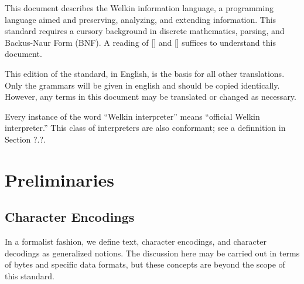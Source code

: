 

This document describes the Welkin information language, a programming language aimed and preserving, analyzing, and extending information. This standard requires a cursory background in discrete mathematics, parsing, and Backus-Naur Form (BNF). A reading of [] and [] suffices to understand this document.

This edition of the standard, in English, is the basis for all other translations. Only the grammars will be given in english and should be copied identically. However, any terms in this document may be translated or changed as necessary.

Every instance of the word ``Welkin interpreter'' means ``official Welkin interpreter.'' This class of interpreters are also conformant; see a definnition in Section ?.?.

\section{Preliminaries}

\newcommand*{\chars}{\mathrm{CHAR}}
\newcommand*{\numbers}{\mathrm{NUMBER}}
\newcommand*{\whitespaces}{\mathrm{WHITE\_SPACES}}
\newcommand*{\reserved}{\mathrm{RESERVED}}
\newcommand*{\strings}{\mathrm{STRING}}
\newcommand*{\term}{\mathrm{term}}
\newcommand*{\terms}{\mathrm{terms}}
\newcommand*{\delimiters}{\mathrm{DELIMITERS}}
\newcommand*{\escapes}{\mathrm{ESCAPE}}
\newcommand*{\encoding}{\mathcal{E}}
\newcommand*{\decoding}{\mathcal{D}}


\newcommand*{\scope}{\textrm{scope}}


\subsection{Character Encodings}
In a formalist fashion, we define text, character encodings, and character decodings as generalized notions. The discussion here may be carried out in terms of bytes and specific data formats, but these concepts are beyond the scope of this standard.

